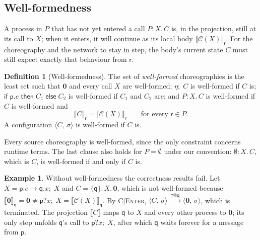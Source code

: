 \documentclass[11pt]{article}
\makeatletter
\theoremstyle{plain}
\theoremstyle{definition}
\newtheorem{definition}[theorem]{Definition}
\newtheorem{example}[theorem]{Example}
\theoremstyle{remark}
\newcommand{\kw}[1]{\mathsf{#1}}
\newcommand{\kif}{\kw{if}\;}
\newcommand{\kthen}{\;\kw{then}\;}
\newcommand{\kelse}{\;\kw{else}\;}
\newcommand{\nil}{\mathbf{0}}
\newcommand{\seq}{;\;}
\newcommand{\pp}{\mathsf{p}}
\newcommand{\qq}{\mathsf{q}}
\newcommand{\rr}{\mathsf{r}}
\newcommand{\conf}[2]{\langle #1,\, #2\rangle}
\newcommand{\lto}[1]{\xrightarrow{\;#1\;}}
\newcommand{\proj}[2]{\llbracket #1 \rrbracket_{#2}}
\newcommand{\projn}[1]{\llbracket #1 \rrbracket}
\newcommand{\tauat}[1]{\tau\mathord{@}#1}
\newcommand{\rn}[1]{{\normalfont\scshape #1}}
\newcommand{\ifcond}[3]{\kif #1 \kthen #2 \kelse #3}
\newcommand{\Defs}{\mathcal{C}}
\newcommand{\body}[1]{\Defs(#1)}
\newcommand{\rt}[3]{#1\mathbin{:}#2.\,#3}
\makeatother
\begin{document}
\subsection{Well-formedness}
\label{sec:wf}

A process in $P$ that has not yet entered a call $\rt{P}{X}{C}$ is, in the
projection, still at its call to $X$; when it enters, it will continue as its
local body $\proj{\body{X}}{\rr}$.  For the choreography and the network to
stay in step, the body's current state $C$ must still expect exactly that
behaviour from $\rr$.

\begin{definition}[Well-formedness]\label{def:wf}
  The set of \emph{well-formed} choreographies is the least set such that
  $\nil$ and every call $X$ are well-formed; $\eta\seq C$ is well-formed if
  $C$ is; $\ifcond{\pp.e}{C_1}{C_2}$ is well-formed if $C_1$ and $C_2$ are; and
  $\rt{P}{X}{C}$ is well-formed if $C$ is well-formed and
  \[
    \proj{C}{\rr} = \proj{\body{X}}{\rr}\qquad\text{for every } \rr\in P.
  \]
  A configuration $\conf{C}{\sigma}$ is well-formed if $C$ is.
\end{definition}

Every source choreography is well-formed, since the only constraint concerns
runtime terms.  The last clause also holds for $P=\emptyset$ under our
convention: $\rt{\emptyset}{X}{C}$, which is $C$, is well-formed if and only
if $C$ is.

\begin{example}\label{ex:not-wf}
  Without well-formedness the correctness results fail.  Let
  $X = \pp.e\to\qq.x\seq X$ and $C = \rt{\{\qq\}}{X}{\nil}$, which is not
  well-formed because $\proj{\nil}{\qq} = \nil \neq \pp?x\seq X = \proj{\body{X}}{\qq}$.
  By \rn{C|Enter}, $\conf{C}{\sigma}\lto{\tauat\qq}\conf{\nil}{\sigma}$, which
  is terminated.  The projection $\projn{C}$ maps $\qq$ to $X$ and every
  other process to $\nil$; its only step unfolds $\qq$'s call to
  $\pp?x\seq X$, after which $\qq$ waits forever for a message from $\pp$.
\end{example}
\end{document}
